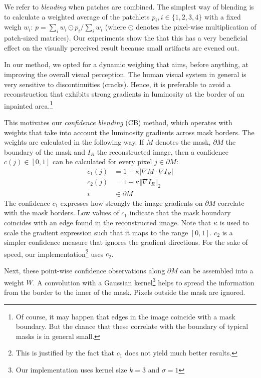 We refer to \textit{blending} when patches are combined. The simplest way of blending is to calculate a weighted average of the patchlets $p_i, i\in\{1,2,3,4\}$ with a fixed weigh $w_i$: $p=\sum_i w_i \odot p_i/\sum_i w_i$ (where $\odot$ denotes the pixel-wise multiplication of patch-sized matrices). Our experiments show the that this has a very beneficial effect on the visually perceived result because small artifacts are evened out.

In our method, we opted for a dynamic weighing that aims, before anything, at improving the overall visual perception. 
The human visual system in general is very sensitive to discontinuities (cracks). Hence, it is preferable to avoid a reconstruction that exhibits strong gradients in luminosity at the border of an inpainted area.\footnote{Of course, it may happen that edges in the image coincide with a mask boundary. But the chance that these correlate with the boundary of typical masks is in general small.}

This motivates our \textit{confidence blending} (CB) method, which operates with weights that take into account the luminosity gradients across mask borders. The weights are calculated in the following way. If $M$ denotes the mask, $\partial M$ the boundary of the mask and $I_R$ the reconstructed image, then a confidence $c(j) \in [0,1]$ can be calculated for every pixel $j\in \partial M$:
\begin{align*}
c_1(j) &= 1-\kappa|\nabla M \cdot \nabla I_R|\\
c_2(j) &= 1-\kappa \Vert\nabla I_R\Vert_2\\
i &\in \partial M
\end{align*}
The confidence $c_1$ expresses how strongly the image gradients on $\partial M$ correlate with the mask borders. Low values of $c_1$ indicate that the mask boundary coincides with an edge found in the reconstructed image. Note that $\kappa$ is used to scale the gradient expression such that it maps to the range $[0,1]$. $c_2$ is a simpler confidence measure that ignores the gradient directions. For the sake of speed, our implementation\footnote{This is justified by the fact that $c_1$ does not yield much better results.} uses $c_2$.

Next, these point-wise confidence observations along $\partial M$ can be assembled into a weight $W$. A convolution with a Gaussian kernel\footnote{Our implementation uses kernel size $k=3$ and $\sigma=1$} helps to spread the information from the border to the inner of the mask. Pixels outside the mask are ignored.

